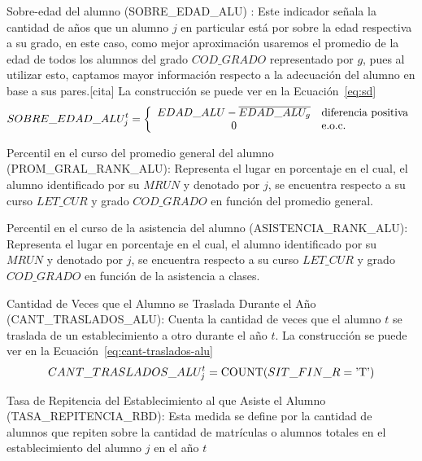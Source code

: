 \begin{longdescription}
\begin{longdescription}
              \item[Sobre-edad del alumno] (SOBRE\_EDAD\_ALU) : Este indicador señala la cantidad de años que un alumno $j$ en particular está por sobre la edad respectiva a su grado, en este caso, como mejor aproximación usaremos el promedio de la edad de todos los alumnos del grado $COD\_GRADO$ representado por $g$, pues al utilizar esto, captamos mayor información respecto a la adecuación del alumno en base a sus pares.[cita] La construcción se puede ver en la Ecuación~\ref{eq:sd}
              \begin{equation}
              \centering
              SOBRE\_EDAD\_ALU_{j}^{t} = \left\{
                \begin{array}{c l}
                 EDAD\_ALU -\overline{EDAD\_ALU_g} & \mbox{diferencia positiva}\\
                 0 & \mbox{e.o.c.}
                \end{array}
                \right.
                \label{eq:sd}
              \end{equation}
              \item[Percentil en el curso del promedio general del alumno] (PROM\_GRAL\_RANK\_ALU): Representa el lugar en porcentaje en el cual, el alumno identificado por su $MRUN$ y denotado por $j$, se encuentra respecto a su curso $LET\_CUR$ y grado $COD\_GRADO$ en función del promedio general.
              \item[Percentil en el curso de la asistencia del alumno](ASISTENCIA\_RANK\_ALU): Representa el lugar en porcentaje en el cual, el alumno identificado por su $MRUN$ y denotado por $j$, se encuentra respecto a su curso $LET\_CUR$ y grado $COD\_GRADO$ en función de la asistencia a clases.
              \item[Cantidad de Veces que el Alumno se Traslada Durante el Año](CANT\_TRASLADOS\_ALU):
             Cuenta la cantidad de veces que el alumno $t$ se traslada de un establecimiento a otro durante el año $t$. La construcción se puede ver en la Ecuación~\ref{eq:cant-traslados-alu}
            \begin{equation}
              \centering
              CANT\_TRASLADOS\_ALU_{j}^{t} = \mbox{COUNT}(SIT\_FIN\_R = \mbox{'T'} )
                \label{eq:cant-traslados-alu}
              \end{equation}
              \item[Tasa de Repitencia del Establecimiento al que Asiste el Alumno](TASA\_REPITENCIA\_RBD): Esta medida se define por la cantidad de alumnos que repiten sobre la cantidad de matrículas o alumnos totales en el establecimiento del alumno $j$ en el año $t$

\end{longdescription}
\end{longdescription}
